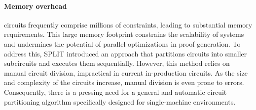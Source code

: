 \paragraph{Memory overhead} 
\zk circuits frequently comprise millions of constraints, leading to substantial memory requirements. This large memory footprint constrains the scalability of \zk systems and undermines the potential of parallel optimizations in proof generation. To address this, SPLIT \cite{qi2023split} introduced an approach that partitions circuits into smaller subcircuits and executes them sequentially. However, this method relies on manual circuit division, impractical in current in-production \zk circuits. As the size and complexity of the circuits increase, manual division is even prone to errors. Consequently, there is a pressing need for a general and automatic circuit partitioning algorithm specifically designed for single-machine environments.








